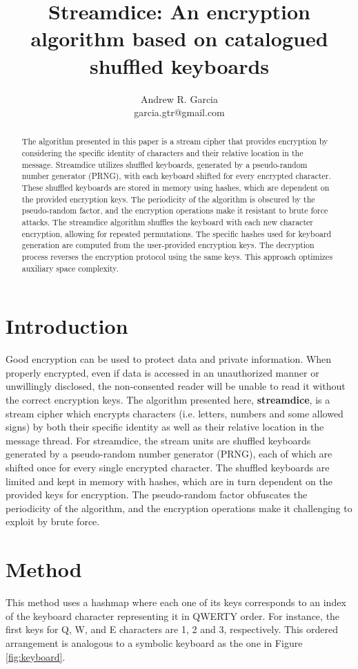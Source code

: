 \documentclass{article}
\title{Streamdice: An encryption algorithm based on catalogued shuffled keyboards}
\author{Andrew R. Garcia\\garcia.gtr@gmail.com}
\date{}
\begin{document}
\maketitle

\begin{abstract}
The algorithm presented in this paper is a stream cipher that provides encryption by considering the specific 
identity of characters and their relative location in the message. Streamdice utilizes shuffled keyboards,
generated by a pseudo-random number generator (PRNG), with each keyboard shifted for every encrypted character. 
These shuffled keyboards are stored in memory using hashes, which are dependent on the provided encryption keys. 
The periodicity of the algorithm is obscured by the pseudo-random factor, and the encryption operations make it resistant to brute force attacks. The streamdice algorithm shuffles the keyboard with each new character encryption, allowing for repeated permutations. 
The specific hashes used for keyboard generation are computed from the user-provided encryption keys. 
The decryption process reverses the encryption protocol using the same keys. This approach optimizes auxiliary space complexity.

\end{abstract}

\section{Introduction}
Good encryption can be used to protect data and private information. When properly encrypted, even if data is accessed in an unauthorized manner or unwillingly disclosed, the non-consented reader will be unable to read it without the correct encryption keys. The algorithm presented here, \textbf{streamdice}, is a stream cipher which encrypts characters (i.e. letters, numbers and some allowed signs) by both their specific identity as well as their relative location in the message thread. For streamdice, the stream units are shuffled keyboards generated by a pseudo-random number generator (PRNG), each of which are shifted once for every single encrypted character. The shuffled keyboards are limited and kept in memory with hashes, which are in turn dependent on the provided keys for encryption. The pseudo-random factor obfuscates the periodicity of the algorithm, and the encryption operations make it challenging to exploit by brute force.

\section{Method}
This method uses a hashmap where each one of its keys corresponds to an index of the keyboard character representing it in QWERTY order. 
For instance, the first keys for Q, W, and E characters are 1, 2 and 3, respectively. This ordered arrangement is analogous to a symbolic 
keyboard as the one in Figure \ref{fig:keyboard}.
\end{document}
